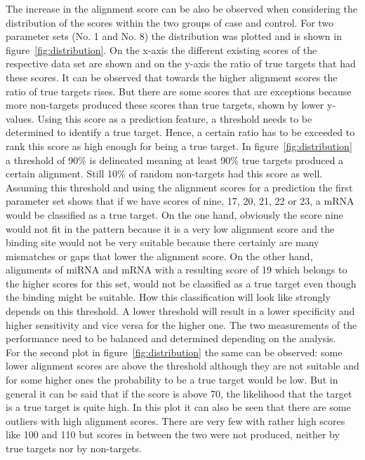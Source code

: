 \documentclass[11pt,  a4paper]{report}
\begin{document}
The increase in the alignment score can be also be observed when considering the distribution of the scores within the two groups of case and control. For two parameter sets (No. 1 and No. 8) the distribution was plotted and is shown in figure~\ref{fig:distribution}. On the x-axis the different existing scores of the respective data set are shown and on the y-axis the ratio of true targets that had these scores. It can be observed that towards the higher alignment scores the ratio of true targets rises. But there are some scores that are exceptions because more non-targets produced these scores than true targets, shown by lower y-values. Using this score as a prediction feature, a threshold needs to be determined to identify a true target. Hence, a certain ratio has to be exceeded to rank this score as high enough for being a true target. In figure~\ref{fig:distribution} a threshold of 90\% is delineated meaning at least 90\% true targets produced a certain alignment. Still 10\% of random non-targets had this score as well. Assuming this threshold and using the alignment scores for a prediction the first parameter set shows that if we have scores of nine, 17, 20, 21, 22 or 23, a mRNA would be classified as a true target. On the one hand, obviously the score nine would not fit in the pattern because it is a very low alignment score and the binding site would not be very suitable because there certainly are many mismatches or gaps that lower the alignment score. On the other hand, alignments of miRNA and mRNA with a resulting score of 19 which belongs to the higher scores for this set, would not be classified as a true target even though the binding might be suitable. How this classification will look like strongly depends on this threshold. A lower threshold will result in a lower specificity and higher sensitivity and vice versa for the higher one. The two measurements of the performance need to be balanced and determined depending on the analysis. \\

For the second plot in figure~\ref{fig:distribution} the same can be observed: some lower alignment scores are above the threshold although they are not suitable and for some higher ones the probability to be a true target would be low. But in general it can be said that if the score is above 70, the likelihood that the target is a true target is quite high. In this plot it can also be seen that there are some outliers with high alignment scores. There are very few with rather high scores like 100 and 110 but scores in between the two were not produced, neither by true targets nor by non-targets.  \\
\end{document}

